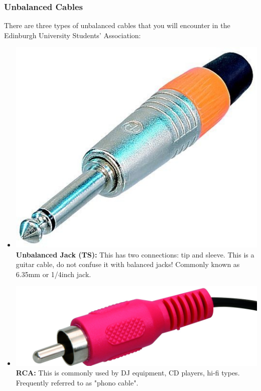 \documentclass[14pt,twocolumn]{extarticle} %
\begin{document}
\subsubsection{Unbalanced Cables}
\label{unbalanced-cables} 
There are three types of unbalanced cables that you will encounter in the Edinburgh University Students' Association:


\begin{itemize}

\item \includegraphics[scale=0.22]{jack_ts.jpg}\textbf{Unbalanced Jack (TS):} This has two connections: tip and sleeve. This is a guitar cable, do not confuse it with balanced jacks! Commonly known as 6.35mm or 1/4inch jack.

\item \includegraphics[scale=0.11]{rca.jpg}\textbf{RCA:} This is commonly used by DJ equipment, CD players, hi-fi types. Frequently referred to as "phono cable".


\end{itemize}
\end{document}
